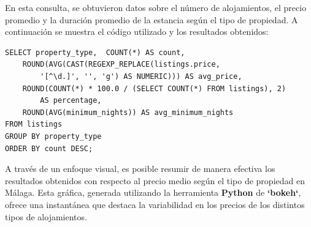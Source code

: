 En esta consulta, se obtuvieron datos sobre el número de alojamientos, el precio promedio y la duración promedio de la estancia según el tipo de propiedad. A continuación se muestra el código utilizado y los resultados obtenidos:
\begin{verbatim}
SELECT property_type,  COUNT(*) AS count, 
    ROUND(AVG(CAST(REGEXP_REPLACE(listings.price,
        '[^\d.]', '', 'g') AS NUMERIC))) AS avg_price, 
    ROUND(COUNT(*) * 100.0 / (SELECT COUNT(*) FROM listings), 2) 
        AS percentage, 
    ROUND(AVG(minimum_nights)) AS avg_minimum_nights
FROM listings
GROUP BY property_type 
ORDER BY count DESC;
\end{verbatim}
\begin{table}[h]
\centering
{}
\caption{Datos de alojamientos por tipo}
\end{table}
\newpage
A través de un enfoque visual, es posible resumir de manera efectiva los resultados obtenidos con respecto al precio medio según el tipo de propiedad en Málaga. Esta gráfica, generada utilizando la herramienta \textbf{Python} de \textbf{`bokeh`}, ofrece una instantánea que destaca la variabilidad en los precios de los distintos tipos de alojamientos.

